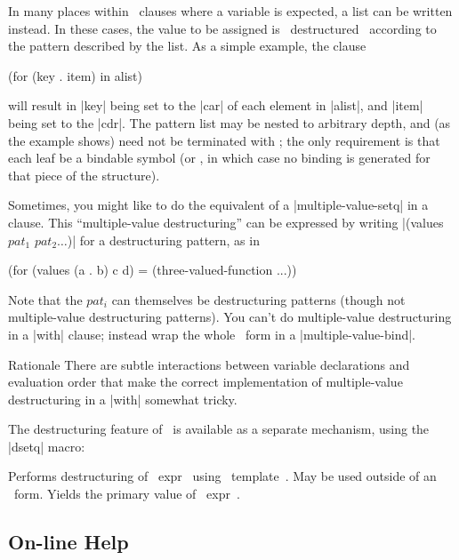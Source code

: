 In many places within \iter\ clauses where a variable is expected, a
list can be written instead.  In these cases, the value to be assigned
is ~destructured~ according to the pattern
described by the list.  As a simple example, the clause
\begin{program}
(for (key . item) in alist)
\end{program}
\noindent will result in |key| being set to the |car| of
each element in |alist|, and |item| being set to the |cdr|.  The
pattern list may be nested to arbitrary depth, and (as the example
shows) need not be terminated with \nil; the only requirement is that
each leaf be a bindable symbol (or \nil, in which case no binding is
generated for that piece of the structure).

Sometimes, you might like to do the equivalent of a
|multiple-value-setq| in a clause.  This
``multiple-value destructuring'' can be expressed by writing
\linebreak |(values $pat_1$ $pat_2 \ldots$)| for a destructuring
pattern, as in
\begin{program}
(for (values (a . b) c d) = (three-valued-function ...))
\end{program}
\begin{sloppypar}
Note that the $pat_i$ can themselves be destructuring patterns (though
not multiple-value destructuring patterns).  You can't do multiple-value
destructuring in a |with| clause; instead wrap the whole \iter\
form in a |multiple-value-bind|.
\end{sloppypar}

\begin{note}{Rationale}
There are subtle interactions between variable declarations and
evaluation order that make the correct implementation of
multiple-value destructuring in a |with| somewhat tricky.
\end{note}

The destructuring feature of \iter\ is available as a separate
mechanism, using the |dsetq| macro:

\begin{clauses}
Performs destructuring of ~expr~ using ~template~.   May be used
outside of an \iter\ form. Yields the primary value of ~expr~.

\end{clauses}

\subsection{On-line Help}

